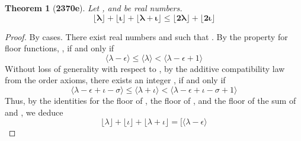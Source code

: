 \documentclass[preview]{standalone}
\newtheorem{theorem}{Theorem}
\begin{document}
\begin{theorem}[\textbf{2370e}]
    Let \bm{$\lambda$}, and \bm{$\iota$} be real numbers.
    \begin{equation*}
        \bm{
            \big \lfloor \lambda \big \rfloor 
                + 
            \big \lfloor \iota \big \rfloor  
                + 
            \big \lfloor \lambda + \iota \big \rfloor 
                \le 
            \big \lfloor 2 \lambda \big \rfloor 
                + 
            \big \lfloor 2 \iota \big \rfloor
        }
    \end{equation*}
\end{theorem}

\begin{proof}
    By cases.
    There exist real numbers \bm{$\epsilon$} and \bm{$\sigma$} such that
    \bm{$\lambda - \lfloor \lambda \rfloor = \epsilon$}. 
    By the property for floor functions,
    \bm{$\lfloor \lambda \rfloor = \lambda - \epsilon$},
    if and only if
    \begin{equation*}
        \Big \langle \lambda - \epsilon \Big \rangle
            \leq 
        \Big \langle \lambda \Big \rangle
            < 
        \Big \langle \lambda - \epsilon + 1 \Big \rangle
    \end{equation*}
    Without loss of generality with respect to \bm{$\iota$}, 
    by the additive compatibility law from the order axioms,
    there exists an integer 
    \bm{$
        \lfloor \lambda + \iota \rfloor 
            = 
        \big \langle \lambda - \epsilon \big \rangle
            +
        \big \langle \iota - \sigma \big \rangle$},
    if and only if
    \begin{equation*}
        \Big \langle
            \lambda - \epsilon
                + 
            \iota - \sigma
        \Big \rangle
            \leq 
        \Big \langle \lambda + \iota \Big \rangle
            < 
        \Big \langle
            \lambda - \epsilon
                + 
            \iota - \sigma
                + 
            1
        \Big \rangle
    \end{equation*}
    Thus, by the identities for the floor of \bm{$\lambda$},
    the floor of \bm{$\iota$}, 
    and the floor of the sum of \bm{$\lambda$} and \bm{$\iota$},
    we deduce 
    \begin{equation*}
        \big \lfloor \lambda \big \rfloor
            +
        \big \lfloor \iota \big \rfloor
            +
        \big \lfloor \lambda + \iota \big \rfloor
            =
        \Big[
            \big \langle \lambda - \epsilon \big \rangle

\end{equation*}
\end{proof}
\end{document}
